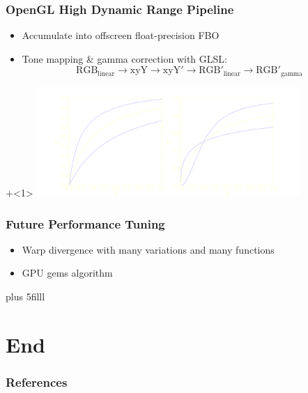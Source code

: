 \documentclass{beamer}
\newcommand{\vf}[1]{\vskip0pt plus #1}
\begin{document}
\begin{frame}
  \frametitle{OpenGL High Dynamic Range Pipeline}
  \begin{itemize}
    \item
      Accumulate into offscreen float-precision FBO
    \item
      Tone mapping \& gamma correction with GLSL:
      \[
      \text{RGB}_{\text{linear}}\to \text{xyY} \to \text{xyY}' \to
      \text{RGB}'_{\text{linear}} \to \text{RGB}'_{\text{gamma}}
      \]
  \end{itemize}
  \onslide+<1>
  \includegraphics[width=10cm]{tone_map.pdf}
\end{frame}


\begin{frame}[fragile]
  \frametitle{Future Performance Tuning}
  \begin{itemize}
    \item
      Warp divergence with many variations and many functions
    \item
      GPU gems algorithm \cite{Schied2011}
  \end{itemize}
  \vf{5filll}
\end{frame}



\section*{End}



\begin{frame}
  \frametitle{References}
  \nocite{*}
  
  \fontsize{7pt}{7pt}
  
  \normalsize
\end{frame}



%
%  


\end{document}
